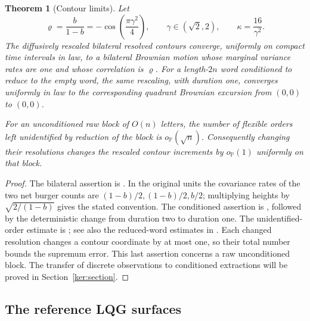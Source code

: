 \documentclass[11pt]{article}
\numberwithin{equation}{section}
\newtheorem{theorem}{Theorem}[section]
\theoremstyle{definition}
\theoremstyle{remark}
\newcommand{\1}{\mathbf 1}
\begin{document}
\begin{theorem}[Contour limits]\label{enc:contour-limits}
Let
\[
 \varrho=\frac b{1-b}=-\cos\left(\frac{\pi\gamma^2}{4}\right),
 \qquad \gamma\in(\sqrt2,2),\qquad \kappa=\frac{16}{\gamma^2}.
\]
The diffusively rescaled bilateral resolved contours converge, uniformly
on compact time intervals in law, to a bilateral Brownian motion whose
marginal variance rates are one and whose correlation is $\varrho$.
For a length-$2n$ word conditioned to reduce to the empty word, the same
rescaling, with duration one, converges uniformly in law to the corresponding
quadrant Brownian excursion from $(0,0)$ to $(0,0)$.

For an unconditioned raw block of $O(n)$ letters, the number of flexible
orders left unidentified by reduction of the block is $o_{\mathbb P}(\sqrt n)$.
Consequently changing their resolutions changes the rescaled contour
increments by $o_{\mathbb P}(1)$ uniformly on that block.
\end{theorem}

\begin{proof}
The bilateral assertion is \cite[Theorem 2.5]{SheffieldInventory}.
In the original units the covariance rates of the two net burger counts
are $(1-b)/2,(1-b)/2,b/2$; multiplying heights by
$\sqrt{2/(1-b)}$ gives the stated convention.  The conditioned assertion is
\cite[Theorem 1.8]{GwynneSunFKIII}, followed by the deterministic change
from duration two to duration one.  The unidentified-order estimate is
\cite[Remark 3.17]{SheffieldInventory}; see also the reduced-word estimates
in \cite{GwynneMaoSunFKI}.  Each changed resolution changes a contour
coordinate by at most one, so their total number bounds the supremum error.
This last assertion concerns a raw unconditioned block.  The transfer of
discrete observations to conditioned extractions will be proved in
Section~\ref{ker:section}.
\end{proof}

\subsection{The reference LQG surfaces}
\end{document}

